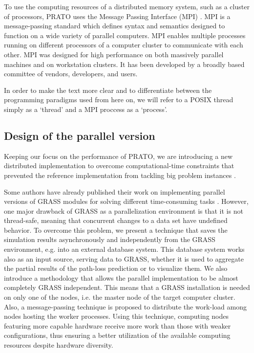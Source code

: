 To use the computing resources of a distributed memory system, such
as a cluster of processors, PRATO uses the Message Passing Interface
(MPI) \cite{Gropp_Using_MPI:1999}. MPI is a message-passing standard
which defines syntax and semantics designed to function on a wide
variety of parallel computers. MPI enables multiple processes running
on different processors of a computer cluster to communicate with
each other. MPI was designed for high performance on both massively
parallel machines and on workstation clusters. It has been developed
by a broadly based committee of vendors, developers, and users.

In order to make the text more clear and to differentiate between
the programming paradigms used from here on, we will refer to a POSIX
thread simply as a `thread' and a MPI proccess as a `process'.


\subsection{Design of the parallel version\label{sub:Design-parallel}}

Keeping our focus on the performance of PRATO, we are introducing
a new distributed implementation to overcome computational-time constraints
that prevented the reference implementation from tackling big problem
instances \cite{Ozimek_Open.source.radio.coverage.prediction:2010}.

Some authors have already published their work on implementing parallel
versions of GRASS modules for solving different time-consuming tasks
\cite{Akhter_Porting_GRASS_raster_module_to_distributed_computing:2007,Campos_Parallel_modelling_in_GIS:2012,Sorokine_Parallel_visualization_in_GRASS:2007}.
However, one major drawback of GRASS as a parallelization environment
is that it is not thread-safe, meaning that concurrent changes to
a data set have undefined behavior. To overcome this problem, we present
a technique that saves the simulation results asynchronously and independently
from the GRASS environment, e.g. into an external database system.
This database system works also as an input source, serving data to
GRASS, whether it is used to aggregate the partial results of the
path-loss prediction or to visualize them. We also introduce a methodology
that allows the parallel implementation to be almost completely GRASS
independent. This means that a GRASS installation is needed on only
one of the nodes, i.e. the master node of the target computer cluster.
Also, a message-passing technique is proposed to distribute the work-load
among nodes hosting the worker processes. Using this technique, computing
nodes featuring more capable hardware receive more work than those
with weaker configurations, thus ensuring a better utilization of
the available computing resources despite hardware diversity.


